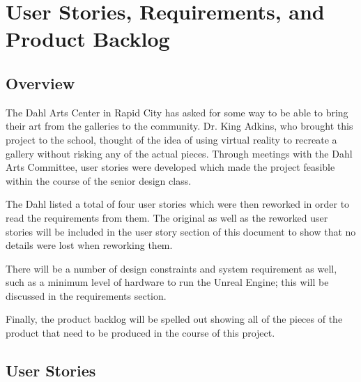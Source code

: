 
\chapter{User Stories,  Requirements, and Product Backlog}
\section{Overview}

The Dahl Arts Center in Rapid City has asked for some way to be able to bring their art from the galleries to the community.  Dr. King Adkins, who brought this project to the school, thought of the idea of using virtual reality to recreate a gallery without risking any of the actual pieces.  Through meetings with the Dahl Arts Committee, user stories were developed which made the project feasible within the course of the senior design class.

The Dahl listed a total of four user stories which were then reworked in order to read the requirements from them.  The original as well as the reworked user stories will be included in the user story section of this document to show that no details were lost when reworking them.  

There will be a number of design constraints and system requirement as well, such as a minimum level of hardware to run the Unreal Engine; this will be discussed in the requirements section.  

Finally, the product backlog will be spelled out showing all of the pieces of the product that need to be produced in the course of this project. 






\section{User Stories}
%

